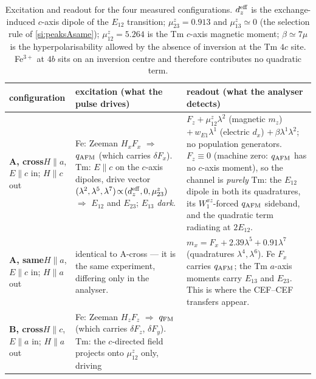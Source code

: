 \documentclass[11pt]{article}
\newcommand{\qafm}{q_{\rm AFM}}
\newcommand{\qfm}{q_{\rm FM}}
\begin{document}
\begin{table}[h]
\centering\small
\caption{Excitation and readout for the four measured configurations.
$d_z^{\rm eff}$ is the exchange-induced $c$-axis dipole of the $E_{12}$
transition; $\mu^z_{23}=0.913$ and $\mu^z_{13}\simeq0$ (the selection
rule of \cref{si:peaksAsame}); $\mu^z_{12}=5.264$ is the Tm $c$-axis
magnetic moment; $\beta\simeq7\mu$ is the hyperpolarisability allowed by
the absence of inversion at the Tm $4c$ site.  Fe$^{3+}$ at $4b$ sits on
an inversion centre and therefore contributes no quadratic term.}
\label{tab:si-channels}
\renewcommand{\arraystretch}{1.35}
\begin{tabular}{p{2.1cm}p{5.2cm}p{7.4cm}}
\toprule
configuration & excitation (what the pulse drives) & readout (what the
analyser detects)\\
\midrule
\textbf{A, cross}\newline $H\!\parallel\!a$, $E\!\parallel\!c$ in;
$H\!\parallel\!c$ out
& Fe: Zeeman $H_x F_x$ $\Rightarrow$ $\qafm$ (which carries
  $\delta F_x$).\newline
  Tm: $E\!\parallel\!c$ on the $c$-axis dipoles, drive vector
  $(\lambda^2,\lambda^5,\lambda^7)\!\propto\!(d_z^{\rm eff},0,\mu^z_{23})$
  $\Rightarrow$ $E_{12}$ and $E_{23}$; $E_{13}$ \emph{dark}.
& $F_z+\mu^z_{12}\lambda^2$ (magnetic $m_z$)
  $+\,w_{E1}\lambda^1$ (electric $d_x$)
  $+\,\beta\lambda^1\lambda^2$; no population generators.\newline
  $F_z\equiv0$ (machine zero: $\qafm$ has no $c$-axis moment), so the
  channel is \emph{purely} Tm: the $E_{12}$ dipole in both its
  quadratures, its $W^{xz}_1$-forced $\qafm$ sideband, and the quadratic
  term radiating at $2E_{12}$.\\
\textbf{A, same}\newline $H\!\parallel\!a$, $E\!\parallel\!c$ in;
$H\!\parallel\!a$ out
& identical to A-cross --- it is the same experiment, differing only in
  the analyser.
& $m_x=F_x+2.39\lambda^5+0.91\lambda^7$ (quadratures
  $\lambda^{4},\lambda^{6}$).\newline
  Fe $F_x$ carries $\qafm$; the Tm $a$-axis moments carry $E_{13}$ and
  $E_{23}$.  This is where the CEF--CEF transfers appear.\\
\textbf{B, cross}\newline $H\!\parallel\!c$, $E\!\parallel\!a$ in;
$H\!\parallel\!a$ out
& Fe: Zeeman $H_z F_z$ $\Rightarrow$ $\qfm$ (which carries
  $\delta F_z$, $\delta F_y$).\newline
  Tm: the $c$-directed field projects onto $\mu^z_{12}$ only, driving

\end{tabular}
\end{table}
\end{document}

